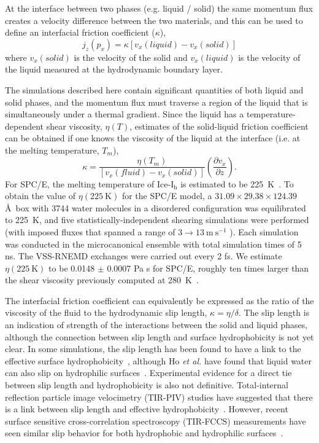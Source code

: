 At the interface between two phases (e.g. liquid / solid) the same
momentum flux creates a velocity difference between the two materials,
and this can be used to define an interfacial friction coefficient
($\kappa$),
\begin{equation}\label{Shenyu-13}
j_{z}(p_{x}) = \kappa \left[ v_{x}(liquid) - v_{x}(solid) \right]
\end{equation}
where $v_{x}(solid)$ is the velocity of the solid and $v_{x}(liquid)$
is the velocity of the liquid measured at the hydrodynamic boundary
layer.

The simulations described here contain significant quantities of both
liquid and solid phases, and the momentum flux must traverse a region
of the liquid that is simultaneously under a thermal gradient.  Since
the liquid has a temperature-dependent shear viscosity, $\eta(T)$,
estimates of the solid-liquid friction coefficient can be obtained if
one knows the viscosity of the liquid at the interface (i.e. at the
melting temperature, $T_m$),
\begin{equation}\label{kappa-2}
\kappa = \frac{\eta(T_{m})}{\left[v_{x}(fluid)-v_{x}(solid)\right]}\left(\frac{\partial v_{x}}{\partial z}\right).
\end{equation}
For SPC/E, the melting temperature of Ice-I$_\mathrm{h}$ is estimated
to be 225~K~\cite{Bryk2002}.  To obtain the value of
$\eta(225\mathrm{~K})$ for the SPC/E model, a $31.09 \times 29.38
\times 124.39$ \AA\ box with 3744 water molecules in a disordered
configuration was equilibrated to 225~K, and five
statistically-independent shearing simulations were performed (with
imposed fluxes that spanned a range of $3 \rightarrow 13
\mathrm{~m~s}^{-1}$ ).  Each simulation was conducted in the
microcanonical ensemble with total simulation times of 5 ns. The
VSS-RNEMD exchanges were carried out every 2 fs. We estimate
$\eta(225\mathrm{~K})$ to be 0.0148 $\pm$ 0.0007 Pa s for SPC/E,
roughly ten times larger than the shear viscosity previously computed
at 280~K~\cite{Kuang2012}.

The interfacial friction coefficient can equivalently be expressed as
the ratio of the viscosity of the fluid to the hydrodynamic slip
length, $\kappa = \eta / \delta$. The slip length is an indication of
strength of the interactions between the solid and liquid phases,
although the connection between slip length and surface hydrophobicity
is not yet clear. In some simulations, the slip length has been found
to have a link to the effective surface
hydrophobicity~\cite{Sendner:2009uq}, although Ho \textit{et al.} have
found that liquid water can also slip on hydrophilic
surfaces~\cite{Ho:2011zr}. Experimental evidence for a direct tie
between slip length and hydrophobicity is also not
definitive. Total-internal reflection particle image velocimetry
(TIR-PIV) studies have suggested that there is a link between slip
length and effective
hydrophobicity~\cite{Lasne:2008vn,Bouzigues:2008ys}. However, recent
surface sensitive cross-correlation spectroscopy (TIR-FCCS)
measurements have seen similar slip behavior for both hydrophobic and
hydrophilic surfaces~\cite{Schaeffel:2013kx}.

